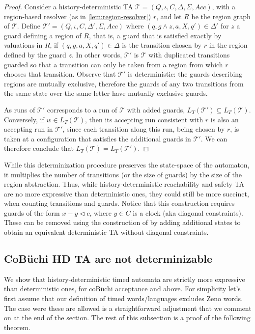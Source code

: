 \documentclass[10pt,a4paper]{amsart}
\theoremstyle{definition}
\numberwithin{equation}{section}
\newcommand{\T}{\mathcal{T}}
\newcommand{\clocks}{C}
\newcommand{\acc}{\mathit{Acc}}
\newcommand{\lang}{L_T}  %
\begin{document}
\begin{proof}
Consider a history-deterministic TA $\T=(Q,\iota,C,\Delta,\Sigma, \acc)$, with a region-based resolver (as in \cref{lem:region-resolver}) $r$, and let $R$ be the region graph of $\T$. Define $\T'=(Q,\iota,C,\Delta',\Sigma, \acc)$ where $(q,g\wedge z,a,X,q')\in \Delta'$  for $z$ a guard defining a region of $R$, that is, a guard that is satisfied exactly by valuations in $R$, if $(q,g,a,X,q')\in \Delta$ is the transition chosen by $r$ in the region defined by the guard $z$.
 In other words, $\T'$ is $\T$ with duplicated transitions guarded so that a transition can only be taken from a region from which $r$ chooses that transition. 
 Observe that $\T'$ is deterministic: the guards describing regions are mutually exclusive,  therefore the guards of any two transitions from the same state over the same letter have mutually exclusive guards.

As runs of $\T'$ corresponds to a run of $\T$ with added guards, $\lang(\T')\subseteq \lang(\T)$. Conversely, if $w\in \lang(\T)$, then its accepting run consistent with $r$ is also an accepting run in $\T'$, since each transition along this run, being chosen by $r$, is taken at a configuration that satisfies the additional guards in $\T'$. We can therefore conclude that $\lang(\T)=\lang(\T')$.
\end{proof}


While this determinization procedure preserves the state-space of the automaton, %
it multiplies the number of transitions (or the size of guards) by the size of the region abstraction. Thus, while history-deterministic reachability and safety TA are no more expressive than deterministic ones, they could still be more succinct, 
when counting transitions and guards.
Notice that this construction requires guards of the form $x-y\triangleleft c$, where $y\in\clocks$ is a clock (aka diagonal constraints). 
These can be removed using the construction of \cite{BPDG98} by adding additional states to obtain an equivalent deterministic TA without diagonal constraints.


\subsection{CoB\"uchi HD TA are not determinizable}
\label{sec:expressivity:d-hd}
We show that history-deterministic timed automata are strictly more expressive than deterministic ones, for coB\"uchi acceptance and above.
For simplicity let's first assume that our definition of timed words/languages excludes Zeno words.
The case were these are allowed is a straightforward adjustment that we comment on at the end of the section.
The rest of this subsection is a proof of the following theorem.
\end{document}
